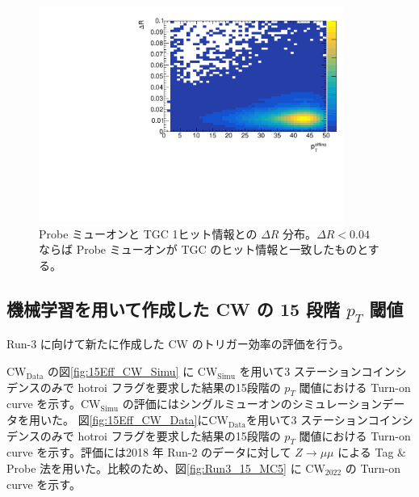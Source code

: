 \begin{figure}[tb]
  \centering
  \includegraphics[clip, width=10cm]{fig/3/dR_probe_RoI.pdf}
  \caption{Probe ミューオンと TGC 1ヒット情報との $\Delta R$ 分布。$\Delta R < 0.04$ ならば Probe ミューオンが TGC のヒット情報と一致したものとする。}
  \label{fig:Probe_TGC}
\end{figure}

\subsection{機械学習を用いて作成した CW の 15 段階 $p_T$ 閾値}
Run-3 に向けて新たに作成した CW のトリガー効率の評価を行う。

$\mathrm{CW_{Data}}$ の図\ref{fig:15Eff_CW_Simu} に $\mathrm{CW_{Simu}}$ を用いて3 ステーションコインシデンスのみで hotroi フラグを要求した結果の15段階の $p_T$ 閾値における Turn-on curve を示す。$\mathrm{CW_{Simu}}$ の評価にはシングルミューオンのシミュレーションデータを用いた。
図\ref{fig:15Eff_CW_Data}に$\mathrm{CW_{Data}}$を用いて3 ステーションコインシデンスのみで hotroi フラグを要求した結果の15段階の $p_T$ 閾値における Turn-on curve を示す。評価には2018 年 Run-2 のデータに対して $Z \rightarrow \mu\mu$ による Tag $\&$ Probe 法を用いた。比較のため、図\ref{fig:Run3_15_MC5} に $\mathrm{CW_{2022}}$ の Turn-on curve を示す。

